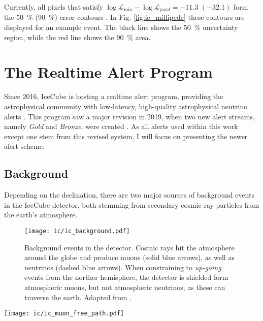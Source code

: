 Currently, all pixels that satisfy $\log \mathcal{L}_\text{min}-\log \mathcal{L}_\text{pixel} = -11.3$ $(-32.1)$ form the \SI{50}{\percent} (\SI{90}{\percent}) error contours . In Fig. \ref{fig:ic_millipede} these contours are displayed for an example event. The black line shows the \SI{50}{\percent} uncertainty region, while the red line shows the \SI{90}{\percent} area. 

\section{The Realtime Alert Program}\label{ic_alert_program}
Since 2016, IceCube is hosting a realtime alert program, providing the astrophysical community with low-latency, high-quality astrophysical neutrino alerts \cite{Aartsen2017a}. This program saw a major revision in 2019, when two new alert streams, namely \textit{Gold} and \textit{Bronze}, were created . As all alerts used within this work except one stem from this revised system, I will focus on presenting the newer alert scheme.

\subsection{Background}\label{background}
Depending on the declination, there are two major sources of background events in the IceCube detector, both stemming from secondary cosmic ray particles from the earth's atmosphere.
\begin{figure}[htb]
    \texttt{[image: ic/ic\_background.pdf]}
    \caption[Background events]{Background events in the detector. Cosmic rays hit the atmosphere around the globe and produce muons (solid blue arrows), as well as neutrinos (dashed blue arrows). When constraining to \textit{up-going} events from the norther hemisphere, the detector is shielded form atmospheric muons, but not atmospheric neutrinos, as these can traverse the earth. Adapted from \cite{Ahlers2018a}.}
\end{figure}

\begin{marginfigure}
    \texttt{[image: ic/ic\_muon\_free\_path.pdf]}
    \caption[Muon free path in ice]{Free path length for \SI{1}{\peta\eV} muons in ice. The mean free path in ice is slightly longer than in rock. From \cite{Chirkin2004}.}
\end{marginfigure}

